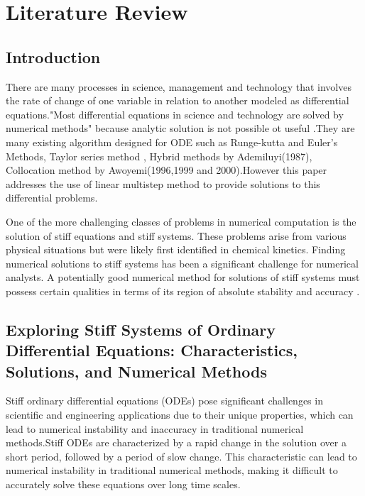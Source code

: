 \raggedbottom
\chapter{Literature Review}
\section{Introduction}
There are many processes in science, management and technology that involves the rate of change of one variable in relation to another modeled as differential equations."Most differential equations in science and technology are solved by numerical methods"\cite{ross} because analytic solution is not possible ot useful \cite{lambert1977}.They are many existing algorithm designed for ODE such as Runge-kutta and Euler's Methods, Taylor series method \cite{lambert1977}, Hybrid methods by Ademiluyi(1987), Collocation method by Awoyemi(1996,1999 and 2000).However this paper addresses the use of linear multistep method to provide solutions to this differential problems.


One of the more challenging classes of problems in numerical computation is the solution of stiff equations and stiff systems. These problems arise from various physical situations but were likely first identified in chemical kinetics. Finding numerical solutions to stiff systems has been a significant challenge for numerical analysts. A potentially good numerical method for solutions of stiff systems must possess certain qualities in terms of its region of absolute stability and accuracy \cite{QURESH2024}.




\section{Exploring Stiff Systems of Ordinary Differential Equations: Characteristics, Solutions, and Numerical Methods}

Stiff ordinary differential equations (ODEs) pose significant challenges in scientific and engineering applications due to their unique properties, which can lead to numerical instability and inaccuracy in traditional numerical methods.Stiff ODEs are characterized by a rapid change in the solution over a short period, followed by a period of slow change. This characteristic can lead to numerical instability in traditional numerical methods, making it difficult to accurately solve these equations over long time scales.

